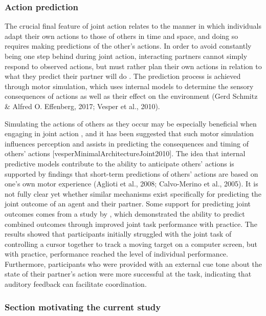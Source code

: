 \documentclass[10pt,a4paper,onecolumn]{article}
\begin{document}
\hypertarget{action-prediction}{%
\subsubsection{Action prediction}\label{action-prediction}}

The crucial final feature of joint action relates to the manner in which individuals adapt their own actions to those of others in time and space, and doing so requires making predictions of the other's actions. In order to avoid constantly being one step behind during joint action, interacting partners cannot simply respond to observed actions, but must rather plan their own actions in relation to what they predict their partner will do \autocite{sebanzJointActionBodies2006}. The prediction process is achieved through motor simulation, which uses internal models to determine the sensory consequences of actions as well as their effect on the environment (Gerd Schmitz \& Alfred O. Effenberg, 2017; Vesper et al., 2010).

Simulating the actions of others as they occur may be especially beneficial when engaging in joint action , and it has been suggested that such motor simulation influences perception and assists in predicting the consequences and timing of others' actions {[}vesperMinimalArchitectureJoint2010{]}. The idea that internal predictive models contribute to the ability to anticipate others' actions is supported by findings that short-term predictions of others' actions are based on one's own motor experience (Aglioti et al., 2008; Calvo-Merino et al., 2005). It is not fully clear yet whether similar mechanisms exist specifically for predicting the joint outcome of an agent and their partner. Some support for predicting joint outcomes comes from a study by \textcite{knoblichActionCoordinationGroups2003}, which demonstrated the ability to predict combined outcomes through improved joint task performance with practice. The results showed that participants initially struggled with the joint task of controlling a cursor together to track a moving target on a computer screen, but with practice, performance reached the level of individual performance. Furthermore, participants who were provided with an external cue tone about the state of their partner's action were more successful at the task, indicating that auditory feedback can facilitate coordination.

\hypertarget{section-motivating-the-current-study}{%
\subsubsection{Section motivating the current study}\label{section-motivating-the-current-study}}
\end{document}
